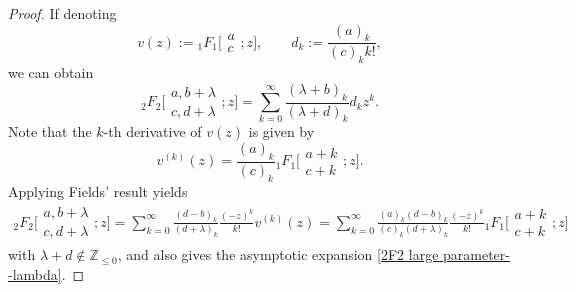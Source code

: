 \documentclass[11pt]{article}
\numberwithin{equation}{section}
\numberwithin{equation}{section}
\newcommand{\ZZ}{\ensuremath{\mathbb{Z}}}
\begin{document}
\begin{proof}
	If denoting
	\[v(z):={}_1F_1\biggl[\begin{matrix}
		a\\
		c
	\end{matrix};z\biggr],\qquad d_k:=\frac{(a)_k}{(c)_k k!},\]
	we can obtain
	\[{}_2F_2\biggl[\begin{matrix}
		a,b+\lambda\\
		c,d+\lambda
	\end{matrix};z\biggr]=\sum_{k=0}^{\infty}\frac{ (\lambda+b )_k}{ (\lambda+d )_k}d_k z^k.\]
	Note that the $k$-th derivative of $v(z)$ is given by \cite[p.~405, equation~(16.3.1)]{NIST-Handbook}
	\[v^{(k)}(z)=\frac{(a)_k}{(c)_k}
	{}_1F_1\biggl[\begin{matrix}
		a+k\\
		c+k
	\end{matrix};z\biggr].\]
	Applying Fields' result \cite[Theorem 3]{Fields-1967} yields
	\begin{gather}\label{2F2 transformation}
		{}_2F_2\biggl[\begin{matrix}
			a,b+\lambda\\
			c,d+\lambda
		\end{matrix};z\biggr]=\sum_{k=0}^{\infty}\frac{(d-b)_k}{(d+\lambda)_k}\frac{(-z)^k}{k!}v^{(k)}(z)=\sum_{k=0}^{\infty}\frac{(a)_k(d-b)_k}{(c)_k(d+\lambda)_k}\frac{(-z)^k}{k!}{}_1F_1\biggl[\begin{matrix}
			a+k\\
			c+k
		\end{matrix};z\biggr]
	\end{gather}
	with $\lambda+d\notin\ZZ_{\leqslant 0}$, and also gives the asymptotic expansion \eqref{2F2 large parameter--lambda}.
\end{proof}
\end{document}
